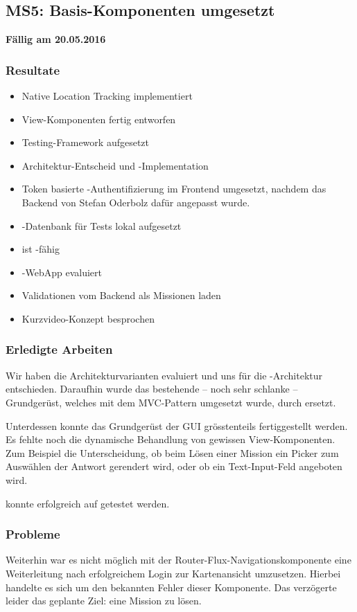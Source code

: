 \subsection{MS5: Basis-Komponenten umgesetzt}
\label{pm-ms5}
\textbf{Fällig am 20.05.2016}
\subsubsection{Resultate}
\begin{itemize}
	\item Native Location Tracking implementiert
	\item View-Komponenten fertig entworfen
	\item Testing-\gls{Framework} aufgesetzt
	\item Architektur-Entscheid und -Implementation
	\item Token basierte -Authentifizierung im Frontend umgesetzt, nachdem das Backend von Stefan Oderbolz dafür angepasst wurde.
	\item \kort{}-Datenbank für Tests lokal aufgesetzt
	\item \kort{} ist -fähig
	\item {}-\gls{WebApp} evaluiert
	\item Validationen vom Backend als Missionen laden
	\item Kurzvideo-Konzept besprochen
\end{itemize}

\subsubsection{Erledigte Arbeiten}

Wir haben die Architekturvarianten evaluiert und uns für die -Architektur entschieden.
Daraufhin wurde das bestehende -- noch sehr schlanke -- Grundgerüst, welches mit dem MVC-Pattern umgesetzt wurde, durch  ersetzt.

Unterdessen konnte das Grundgerüst der \gls{GUI} grösstenteils fertiggestellt werden. 
Es fehlte noch die dynamische Behandlung von gewissen View-Komponenten.
Zum Beispiel die Unterscheidung, ob beim Lösen einer Mission ein Picker zum Auswählen der Antwort gerendert wird, oder ob ein Text-Input-Feld angeboten wird.

\kort{} konnte erfolgreich auf  getestet werden. 

\subsubsection{Probleme}
Weiterhin war es nicht möglich mit der Router-Flux-Navigationskomponente eine Weiterleitung nach erfolgreichem Login zur Kartenansicht umzusetzen.
Hierbei handelte es sich um den bekannten Fehler dieser Komponente.
Das verzögerte leider das geplante Ziel: eine Mission zu lösen.

